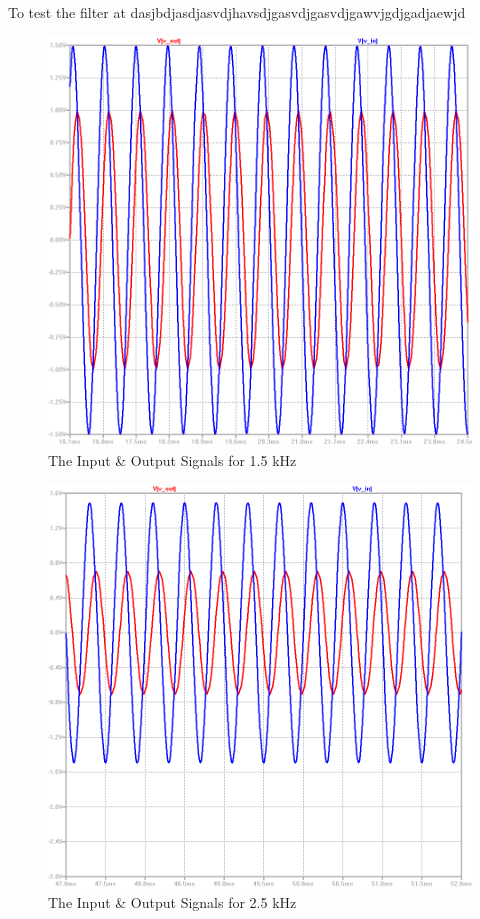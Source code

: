 \documentclass[paper]{IEEEtran}
\begin{document}
	\-\\ \-\\ \-\- To test the filter at dasjbdjasdjasvdjhavsdjgasvdjgasvdjgawvjgdjgadjaewjd 
	
	
\begin{figure}[H]
	\setlength{\unitlength}{\textwidth}
	\center 
	\includegraphics[width=0.45\unitlength]{lpf_op3.png}
	\caption{\label{fig:lpfop3}The Input \& Output Signals for 1.5 kHz}
\end{figure} 


\begin{figure}[H]
	\setlength{\unitlength}{\textwidth}
	\center 
	\includegraphics[width=0.45\unitlength]{lpf_op4.png}
	\caption{\label{fig:lpfop4}The Input \& Output Signals for 2.5 kHz}
\end{figure} 
\end{document}
